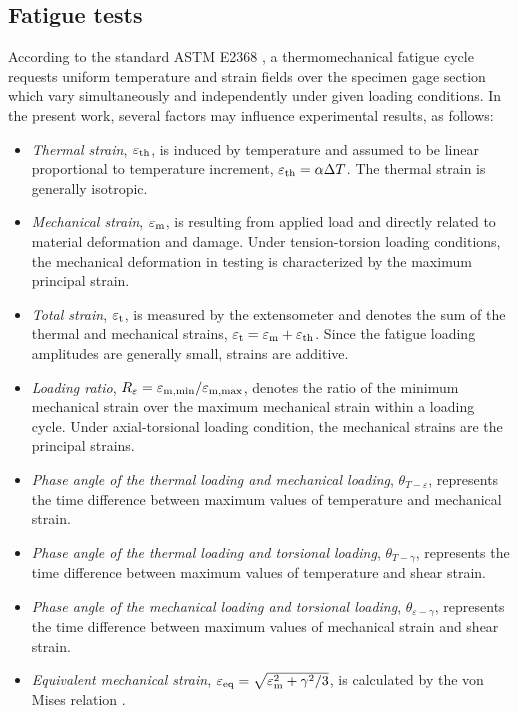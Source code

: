 \documentclass[preprint,5p,twocolumn,11pt,sort&compress]{elsarticle}
\begin{document}
\subsection{Fatigue tests}
According to the standard ASTM E2368 \cite{ASTM2014a}, a thermomechanical fatigue cycle requests uniform temperature and strain fields over the specimen gage section which vary simultaneously and independently under given loading conditions. In the present work, several factors may influence experimental results, as follows:
\begin{itemize}
  \item {\em Thermal strain}, $\varepsilon_{\rm th}$, is induced by temperature and assumed to be linear proportional to temperature increment, $\varepsilon_{\rm th}=\alpha \Delta T$. The thermal strain is generally isotropic.
  \item {\em Mechanical strain}, $\varepsilon_{\rm m}$, is resulting from applied load and directly related to material deformation and damage. Under tension-torsion loading conditions, the mechanical deformation in testing is characterized by the maximum principal strain.
  \item {\em Total strain}, $\varepsilon_{\rm t}$, is measured by the extensometer and denotes the sum of the thermal and mechanical strains, $\varepsilon_{\rm t}=\varepsilon_{\rm m}+\varepsilon_{\rm th}$. Since the fatigue loading amplitudes are generally small, strains are additive.
  \item {\em Loading ratio}, $R_{\varepsilon}=\varepsilon_{\rm m,\min}/\varepsilon_{\rm m,\max}$, denotes the ratio of the minimum mechanical strain over the maximum mechanical strain within a loading cycle. Under axial-torsional loading condition, the mechanical strains are the principal strains.
  \item {\em Phase angle of the thermal loading and mechanical loading}, $\theta_{T-\varepsilon}$, represents the time difference between maximum values of temperature and mechanical strain. %
  \item {\em Phase angle of the thermal loading and torsional loading}, $\theta_{T-\gamma}$, represents the time difference between maximum values of temperature and shear strain.
  \item {\em Phase angle of the mechanical loading and torsional loading}, $\theta_{\varepsilon-\gamma}$, represents the time difference between maximum values of mechanical strain and shear strain.
  \item {\em Equivalent mechanical strain}, $\varepsilon_{\rm eq}=\sqrt {\varepsilon _{\rm m}^2 + {\gamma ^2}/3}$, is calculated by the von Mises relation \cite{Pol1991Cyclic}.
\end{itemize}
\end{document}
